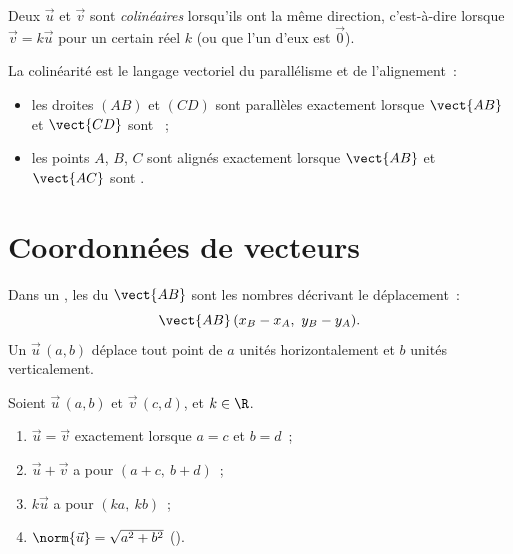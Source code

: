 \begin{definition}[Colinéarité]\label{def:g10:vectors:collinear}
Deux  $\vec u$ et $\vec v$ sont
\emph{colinéaires} lorsqu'ils ont la même
direction, c'est-à-dire lorsque $\vec v = k \vec u$ pour un certain réel
$k$ (ou que l'un d'eux est $\vec 0$).
\end{definition}

\begin{remark}
La colinéarité est le langage vectoriel du parallélisme et de
l'alignement~:
\begin{itemize}
  \item les droites $(AB)$ et $(CD)$ sont parallèles exactement lorsque
        $\vect{AB}$ et $\vect{CD}$ sont ~;
  \item les points $A$, $B$, $C$ sont alignés exactement lorsque
        $\vect{AB}$ et $\vect{AC}$ sont .
\end{itemize}
\end{remark}

\section{Coordonnées de vecteurs}

\begin{definition}\label{def:g10:vectors:coords}
Dans un , les \emph{} du  $\vect{AB}$ sont les
nombres décrivant le déplacement~:
\[
\vect{AB}\,(x_B - x_A,\ y_B - y_A).
\]
Un  $\vec u\,(a, b)$ déplace tout point de $a$ unités
horizontalement et $b$ unités verticalement.
\end{definition}

\begin{proposition}\label{prop:g10:vectors:coordrules}
Soient $\vec u\,(a, b)$ et $\vec v\,(c, d)$, et $k \in \R$.
\begin{enumerate}
  \item $\vec u = \vec v$ exactement lorsque $a = c$ et $b = d$~;
  \item $\vec u + \vec v$ a pour  $(a + c,\ b + d)$~;
  \item $k\vec u$ a pour  $(ka,\ kb)$~;
  \item $\norm{\vec u} = \sqrt{a^2 + b^2}$ ().
\end{enumerate}
\end{proposition}

